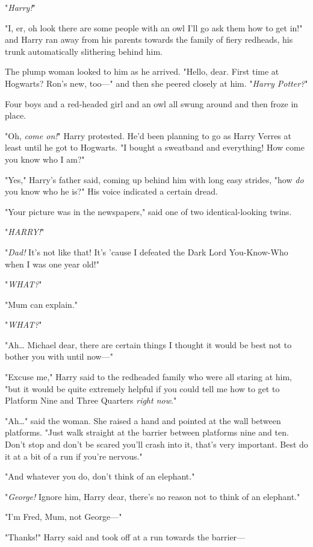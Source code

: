 "\emph{Harry!}"

"I, er, oh look there are some people with an owl I'll go ask them how to get 
in!" and Harry ran away from his parents towards the family of fiery redheads, 
his trunk automatically slithering behind him.

The plump woman looked to him as he arrived. "Hello, dear. First time at 
Hogwarts? Ron's new, too---" and then she peered closely at him. "\emph{Harry 
Potter?}"

Four boys and a red-headed girl and an owl all swung around and then froze in 
place.

"Oh, \emph{come on!}" Harry protested. He'd been planning to go as Harry Verres 
at least until he got to Hogwarts. "I bought a sweatband and everything! How 
come you know who I am?"

"Yes," Harry's father said, coming up behind him with long easy strides, "how 
\emph{do} you know who he is?" His voice indicated a certain dread.

"Your picture was in the newspapers," said one of two identical-looking twins.

"\emph{HARRY!}"

"\emph{Dad!} It's not like that! It's 'cause I defeated the Dark Lord 
You-Know-Who when I was one year old!"

"\emph{WHAT?}"

"Mum can explain."

"\emph{WHAT?}"

"Ah{\ldots} Michael dear, there are certain things I thought it would be best 
not to bother you with until now---"

"Excuse me," Harry said to the redheaded family who were all staring at him, 
"but it would be quite extremely helpful if you could tell me how to get to 
Platform Nine and Three Quarters \emph{right now}."

"Ah{\ldots}" said the woman. She raised a hand and pointed at the wall between 
platforms. "Just walk straight at the barrier between platforms nine and ten. 
Don't stop and don't be scared you'll crash into it, that's very important. 
Best do it at a bit of a run if you're nervous."

"And whatever you do, don't think of an elephant."

"\emph{George!} Ignore him, Harry dear, there's no reason not to think of an 
elephant."

"I'm Fred, Mum, not George---"

"Thanks!" Harry said and took off at a run towards the barrier---

